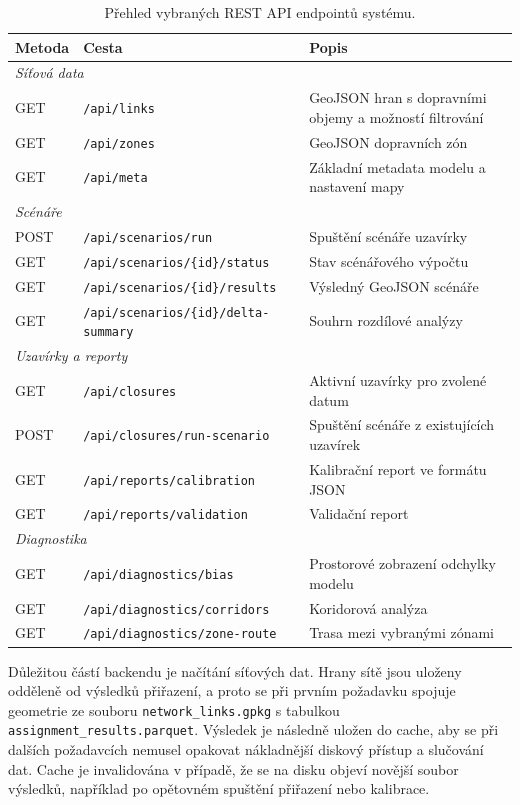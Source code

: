 \begin{table}[ht]
\centering
\caption{Přehled vybraných REST API endpointů systému.}
\label{tab:api-endpoints}
\small
\begin{tabular}{llp{5.5cm}}
\toprule
\textbf{Metoda} & \textbf{Cesta} & \textbf{Popis} \\
\midrule
\multicolumn{3}{l}{\textit{Síťová data}} \\
GET & \texttt{/api/links} & GeoJSON hran s dopravními objemy a možností filtrování \\
GET & \texttt{/api/zones} & GeoJSON dopravních zón \\
GET & \texttt{/api/meta} & Základní metadata modelu a nastavení mapy \\
\midrule
\multicolumn{3}{l}{\textit{Scénáře}} \\
POST & \texttt{/api/scenarios/run} & Spuštění scénáře uzavírky \\
GET & \texttt{/api/scenarios/\{id\}/status} & Stav scénářového výpočtu \\
GET & \texttt{/api/scenarios/\{id\}/results} & Výsledný GeoJSON scénáře \\
GET & \texttt{/api/scenarios/\{id\}/delta-summary} & Souhrn rozdílové analýzy \\
\midrule
\multicolumn{3}{l}{\textit{Uzavírky a reporty}} \\
GET & \texttt{/api/closures} & Aktivní uzavírky pro zvolené datum \\
POST & \texttt{/api/closures/run-scenario} & Spuštění scénáře z existujících uzavírek \\
GET & \texttt{/api/reports/calibration} & Kalibrační report ve formátu JSON \\
GET & \texttt{/api/reports/validation} & Validační report \\
\midrule
\multicolumn{3}{l}{\textit{Diagnostika}} \\
GET & \texttt{/api/diagnostics/bias} & Prostorové zobrazení odchylky modelu \\
GET & \texttt{/api/diagnostics/corridors} & Koridorová analýza \\
GET & \texttt{/api/diagnostics/zone-route} & Trasa mezi vybranými zónami \\
\bottomrule
\end{tabular}
\end{table}

Důležitou částí backendu je načítání síťových dat. Hrany sítě jsou uloženy odděleně od výsledků přiřazení, a proto se při prvním požadavku spojuje geometrie ze souboru \texttt{network\_links.gpkg} s tabulkou \texttt{assignment\_results.parquet}. Výsledek je následně uložen do cache, aby se při dalších požadavcích nemusel opakovat nákladnější diskový přístup a slučování dat. Cache je invalidována v případě, že se na disku objeví novější soubor výsledků, například po opětovném spuštění přiřazení nebo kalibrace.

